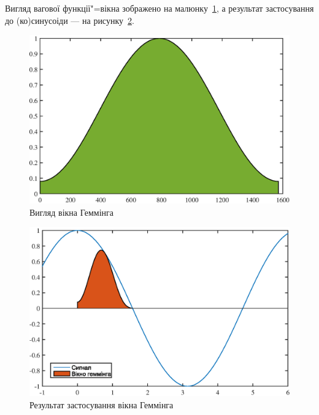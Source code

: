 \begin{enumerate}
                Вигляд вагової функції"=вікна зображено на малюнку~\ref{fig:hamming}, а результат застосування до
                (ко)синусоіди --- на рисунку~\ref{fig:hamming-appl}.

                \begin{figure}[h]
                    \centering
                    \includegraphics[width=\textwidth]{hamming.eps}
                    \caption{Вигляд вікна Геммінга}
                    \label{fig:hamming}
                \end{figure}

                \begin{figure}[h]
                    \centering
                    \includegraphics[width=\textwidth]{hamming-appl.eps}
                    \caption{Результат застосування вікна Геммінга}
                    \label{fig:hamming-appl}
                \end{figure}
        \end{enumerate}



